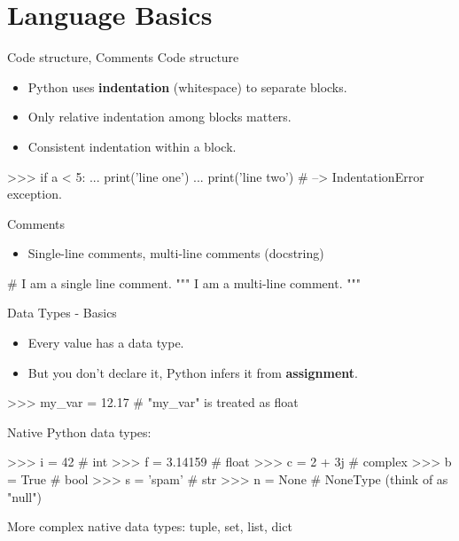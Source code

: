 \documentclass[10pt]{beamer}
\begin{document}
\section{Language Basics}

\begin{frame}[fragile]{Code structure, Comments}
	Code structure
	\begin{itemize}
		\item \pause Python uses \textbf{indentation} (whitespace) to separate blocks.
		\item \pause Only relative indentation among blocks matters.
		\item \pause Consistent indentation within a block.
	\end{itemize}

	\pause
    \begin{pythoncode}
		>>> if a < 5:
		...    print('line one')
		...      print('line two') # --> IndentationError exception.
    \end{pythoncode}

    \pause

    Comments
    \begin{itemize}
	\item \pause Single-line comments, multi-line comments (docstring)
    \end{itemize}

	\pause
	 \begin{pythoncode}
	# I am a single line comment.
	""" I am
	a multi-line comment. """
	\end{pythoncode}
\end{frame}

\begin{frame}[fragile]{Data Types - Basics}
	\begin{itemize}
	\item \pause Every value has a data type.
	\item \pause But you don't declare it, Python infers it from \textbf{assignment}.
	\end{itemize}

	 \begin{pythoncode}
		>>> my_var = 12.17   # "my_var" is treated as float
	\end{pythoncode}

	\pause
	Native Python data types:

	 \begin{pythoncode}
		>>> i = 42      # int
		>>> f = 3.14159 # float
		>>> c = 2 + 3j  # complex
		>>> b = True    # bool
		>>> s = 'spam'  # str
		>>> n = None    # NoneType (think of as "null")
	\end{pythoncode}

	\pause
	More complex native data types: tuple, set, list, dict
\end{frame}
\end{document}
